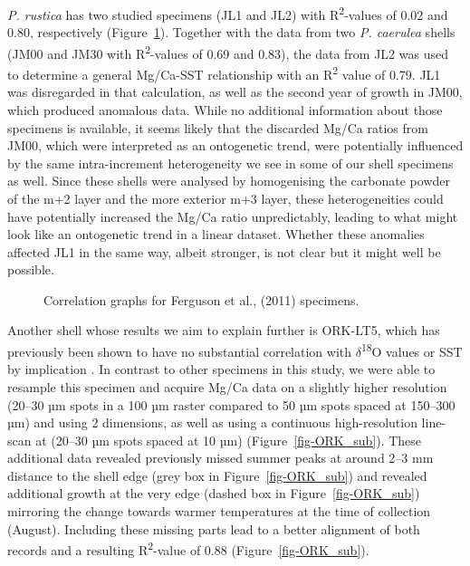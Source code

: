 \documentclass[
  authoryear,
  preprint,
  3p]{elsarticle}
\begin{document}
\emph{P. rustica} has two studied specimens (JL1 and JL2) with
R\textsuperscript{2}-values of 0.02 and 0.80, respectively
\citep{Ferguson2011-zl} (Figure~\ref{fig-Ferg}). Together with the data
from two \emph{P. caerulea} shells (JM00 and JM30 with
R\textsuperscript{2}-values of 0.69 and 0.83), the data from JL2 was
used to determine a general Mg/Ca-SST relationship with an
R\textsuperscript{2} value of 0.79. JL1 was disregarded in that
calculation, as well as the second year of growth in JM00, which
produced anomalous data. While no additional information about those
specimens is available, it seems likely that the discarded Mg/Ca ratios
from JM00, which were interpreted as an ontogenetic trend, were
potentially influenced by the same intra-increment heterogeneity we see
in some of our shell specimens as well. Since these shells were analysed
by homogenising the carbonate powder of the m+2 layer and the more
exterior m+3 layer, these heterogeneities could have potentially
increased the Mg/Ca ratio unpredictably, leading to what might look like
an ontogenetic trend in a linear dataset. Whether these anomalies
affected JL1 in the same way, albeit stronger, is not clear but it might
well be possible.

\begin{figure}


\caption{\label{fig-Ferg}Correlation graphs for Ferguson et al., (2011)
specimens.}

\end{figure}%

Another shell whose results we aim to explain further is ORK-LT5, which
has previously been shown to have no substantial correlation with
$\delta$\textsuperscript{18}O values or SST by implication
\citep{Graniero2017-io}. In contrast to other specimens in this study,
we were able to resample this specimen and acquire Mg/Ca data on a
slightly higher resolution (20--30 µm spots in a 100 µm raster compared
to 50 µm spots spaced at 150--300 µm) and using 2 dimensions, as well as
using a continuous high-resolution line-scan at (20--30 µm spots spaced
at 10 µm) (Figure~\ref{fig-ORK_sub}). These additional data revealed
previously missed summer peaks at around 2--3 mm distance to the shell
edge (grey box in Figure~\ref{fig-ORK_sub}) and revealed additional
growth at the very edge (dashed box in Figure~\ref{fig-ORK_sub})
mirroring the change towards warmer temperatures at the time of
collection (August). Including these missing parts lead to a better
alignment of both records and a resulting R\textsuperscript{2}-value of
0.88 (Figure~\ref{fig-ORK_sub}).
\end{document}
